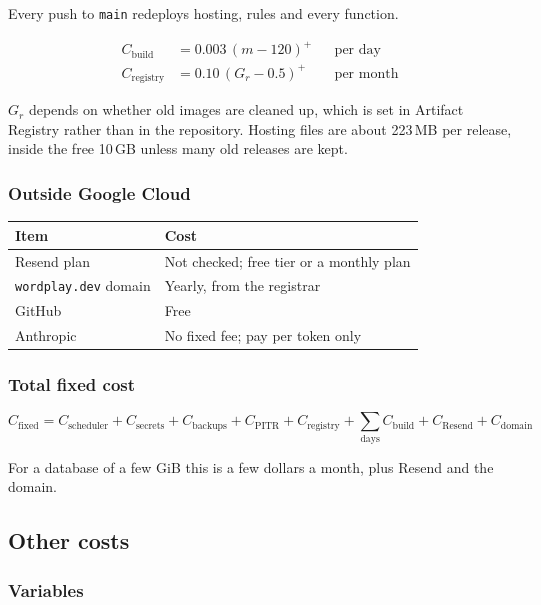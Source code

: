 \documentclass{article}
\newcommand{\pos}[1]{\left(#1\right)^{+}}
\begin{document}
Every push to \texttt{main} redeploys hosting, rules and every function.

\begin{align*}
C_{\text{build}} &= 0.003\,\pos{m - 120} && \text{per day} \\
C_{\text{registry}} &= 0.10\,\pos{G_r - 0.5} && \text{per month}
\end{align*}

$G_r$ depends on whether old images are cleaned up, which is set in Artifact
Registry rather than in the repository. Hosting files are about 223\,MB per
release, inside the free 10\,GB unless many old releases are kept.

\subsubsection{Outside Google Cloud}

\begin{center}
\begin{tabular}{ll}
\toprule
Item & Cost \\
\midrule
Resend plan & Not checked; free tier or a monthly plan \\
\texttt{wordplay.dev} domain & Yearly, from the registrar \\
GitHub & Free \\
Anthropic & No fixed fee; pay per token only \\
\bottomrule
\end{tabular}
\end{center}

\subsubsection{Total fixed cost}

\[
C_{\text{fixed}} =
C_{\text{scheduler}} + C_{\text{secrets}} + C_{\text{backups}}
+ C_{\text{PITR}} + C_{\text{registry}} + \sum_{\text{days}} C_{\text{build}}
+ C_{\text{Resend}} + C_{\text{domain}}
\]

For a database of a few GiB this is a few dollars a month, plus Resend and the
domain.

\subsection{Other costs}

\subsubsection{Variables}
\end{document}
